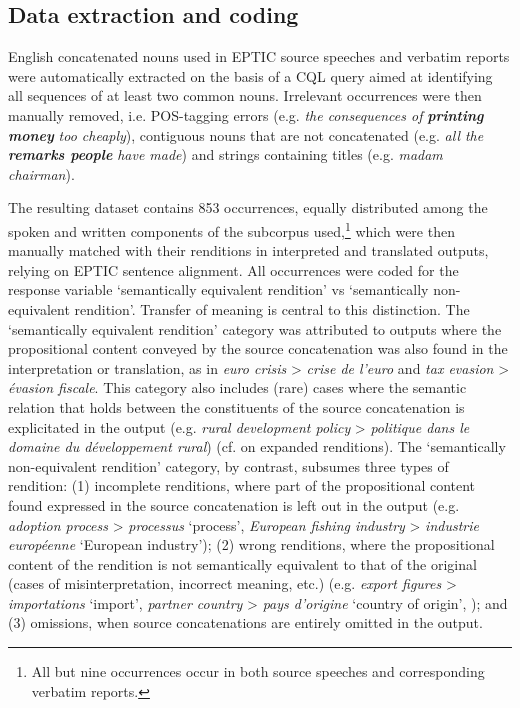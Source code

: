 \documentclass[output=paper]{langscibook}
\begin{document}
\subsection{Data extraction and coding}\label{sec:lefer:3.2}

English concatenated nouns used in EPTIC source speeches and verbatim reports were automatically extracted on the basis of a CQL query aimed at identifying all sequences of at least two common nouns. Irrelevant occurrences were then manually removed, i.e. POS-tagging errors (e.g. \textit{the consequences of} \textbf{\textit{printing money}} \textit{too cheaply}), contiguous nouns that are not concatenated (e.g. \textit{all the} \textbf{\textit{remarks people}} \textit{have made}) and strings containing titles (e.g. \textit{madam chairman}). 

The resulting dataset contains 853 occurrences, equally distributed among the spoken and written components of the subcorpus used,\footnote{All but nine occurrences occur in both source speeches and corresponding verbatim reports.} which were then manually matched with their renditions in interpreted and translated outputs, relying on EPTIC sentence alignment. All occurrences were coded for the response variable ‘semantically equivalent rendition’ vs ‘semantically non-equivalent rendition’. Transfer of meaning is central to this distinction. The ‘semantically equivalent rendition’ category was attributed to outputs where the propositional content conveyed by the source concatenation was also found in the interpretation or translation, as in \textit{euro crisis} > \textit{crise de l’euro} and \textit{tax evasion} > \textit{évasion fiscale}. This category also includes (rare) cases where the semantic relation that holds between the constituents of the source concatenation is explicitated in the output (e.g. \textit{rural development policy} > \textit{politique dans le domaine du développement rural}) (cf. \citealt{Wadensjoe1998} on expanded renditions). The ‘semantically non-equivalent rendition’ category, by contrast, subsumes three types of rendition: (1) incomplete renditions, where part of the propositional content found expressed in the source concatenation is left out in the output (e.g. \textit{adoption process} > \textit{processus} ‘process’, \textit{European fishing industry} > \textit{industrie européenne} ‘European industry’); (2) wrong renditions, where the propositional content of the rendition is not semantically equivalent to that of the original (cases of misinterpretation, incorrect meaning, etc.) (e.g. \textit{export figures} > \textit{importations} ‘import’, \textit{partner country} > \textit{pays d’origine} ‘country of origin’, \citealt[cf.][]{AmatoMack2011}); and (3) omissions, when source concatenations are entirely omitted in the output.
\end{document}
